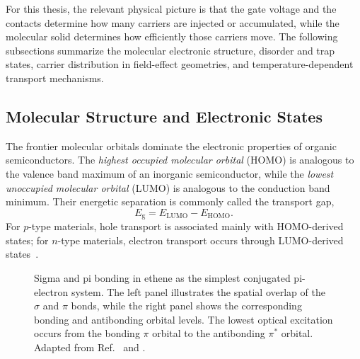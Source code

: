 For this thesis, the relevant physical picture is that the gate voltage and the
contacts determine how many carriers are injected or accumulated, while the
molecular solid determines how efficiently those carriers move. The following
subsections summarize the molecular electronic structure, disorder and trap
states, carrier distribution in field-effect geometries, and temperature-dependent
transport mechanisms.

\subsection{Molecular Structure and Electronic States}
\label{subsec:molecular_structure_electronic_states}

The frontier molecular orbitals dominate the electronic properties of organic
semiconductors. The \textit{highest occupied molecular orbital} (HOMO) is analogous to the
valence band maximum of an inorganic semiconductor, while the \textit{lowest unoccupied molecular
orbital} (LUMO) is analogous to the conduction band minimum. Their energetic separation is
commonly called the transport gap,
\begin{equation}
    E_\mathrm{g} = E_\mathrm{LUMO} - E_\mathrm{HOMO} .
\end{equation}
For $p$-type materials, hole transport is associated mainly with HOMO-derived
states; for $n$-type materials, electron transport occurs through LUMO-derived
states~\cite{Bruetting2005,Coropceanu2007ChargeTransport}.

\begin{figure}[h]
    \centering
    \begin{minipage}{0.45\textwidth}
        \centering
        \resizebox{\textwidth}{!}{}
    \end{minipage}
    \hfill
    \begin{minipage}{0.51\textwidth}
        \centering
        \resizebox{\textwidth}{!}{}
    \end{minipage}
    \caption[Sigma and pi bonding in ethene]{Sigma and pi bonding in ethene as
    the simplest conjugated pi-electron system. The left panel illustrates the
    spatial overlap of the $\sigma$ and $\pi$ bonds, while the right panel shows
    the corresponding bonding and antibonding orbital levels. The lowest optical
    excitation occurs from the bonding $\pi$ orbital to the antibonding
    $\pi^{\ast}$ orbital. Adapted from Ref.~\cite{Riederer2023Dissertation} and \cite{Neamen}.}
    \label{fig:osemi_electron}
\end{figure}

